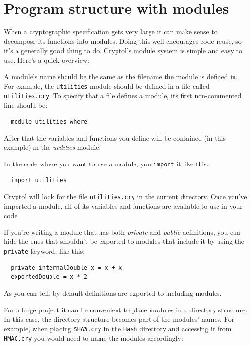 \section{Program structure with modules}

When a cryptographic specification gets very large it can make sense
to decompose its functions into modules.\indModuleSystem\indImport
Doing this well encourages
code reuse, so it's a generally good thing to do. Cryptol's module
system is simple and easy to use. Here's a quick overview:

A module's name should be the same as the filename the module is
defined in. For example, the \verb+utilities+ module should be
defined in a file called \verb+utilities.cry+. To specify that a file
defines a module, its first non-commented line should be:

\begin{verbatim}
  module utilities where
\end{verbatim}

After that the variables and functions you define will be contained
(in this example) in the {\it utilities} module.

In the code where you want to use a module, you \verb+import+ it like this:
\begin{verbatim}
  import utilities
\end{verbatim}

Cryptol will look for the file \verb+utilities.cry+ in the current directory. Once you've imported a module, all of its variables and functions are available to use in your code.

If you're writing a module that has both {\it private} and {\it public}
definitions, you can hide the ones that shouldn't be exported to modules
that include it by using the \verb+private+ keyword, like this:\indPrivate

\begin{verbatim}
  private internalDouble x = x + x
  exportedDouble = x * 2
\end{verbatim}

As you can tell, by default definitions are exported to including modules.

For a large project it can be convenient to place modules in a directory
structure.  In this case, the directory structure becomes part of the modules'
names.  For example, when placing \verb+SHA3.cry+ in the \verb+Hash+ directory and
accessing it from \verb+HMAC.cry+ you would need to name the modules
accordingly:

